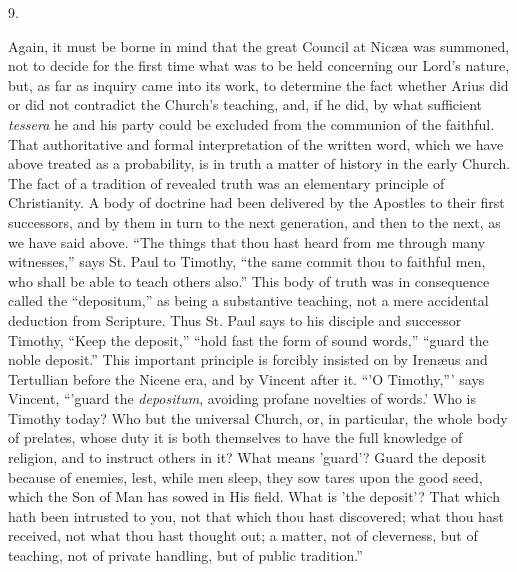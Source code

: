 9.

Again, it must be borne in mind that the great
Council at Nicæa was summoned, not to decide for the first time what
was to be held concerning our Lord's nature, but, as far as inquiry
came into its work, to determine the fact whether Arius did or did not
contradict the Church's teaching, and, if he did, by what sufficient \emph{tessera}
he and his party could be excluded from the communion of the faithful.
That authoritative and formal interpretation of the written word,
which we have above treated as a probability, is in truth a matter of
history in the early Church. The fact of a tradition of revealed truth
was an elementary principle of Christianity. A body of doctrine had
been delivered by the Apostles to their first successors, and by them
in turn to the next generation, and then to the next, as we have said
above. ``The things that thou hast heard from me through many
witnesses,'' says St. Paul to Timothy, ``the same commit thou to
faithful men, who shall be able to teach others also.'' This body of
truth was in consequence called the ``depositum,'' as being a
substantive teaching, not a mere accidental deduction from Scripture.
Thus St. Paul says to his disciple and successor Timothy, ``Keep the
deposit,'' ``hold fast the form of sound words,'' ``guard the noble
deposit.'' This important principle is forcibly insisted on by Irenæus
and Tertullian before the Nicene era, and by Vincent after it. ``'O
Timothy,''' says Vincent, ``'guard the \emph{depositum}, avoiding
profane novelties of words.' Who is Timothy today? Who but the
universal Church, or, in particular, the whole body of prelates, whose
duty it is both themselves to have the full knowledge of religion, and
to instruct others in it? What means 'guard'? Guard the deposit
because of enemies, lest, while men sleep, they sow tares upon the
good seed, which the Son of Man has sowed in His field. What is 'the
deposit'? That which hath been intrusted to you, not that which thou
hast discovered; what thou hast received, not what thou hast thought
out; a matter, not of cleverness, but of teaching, not of private
handling, but of public tradition.''

